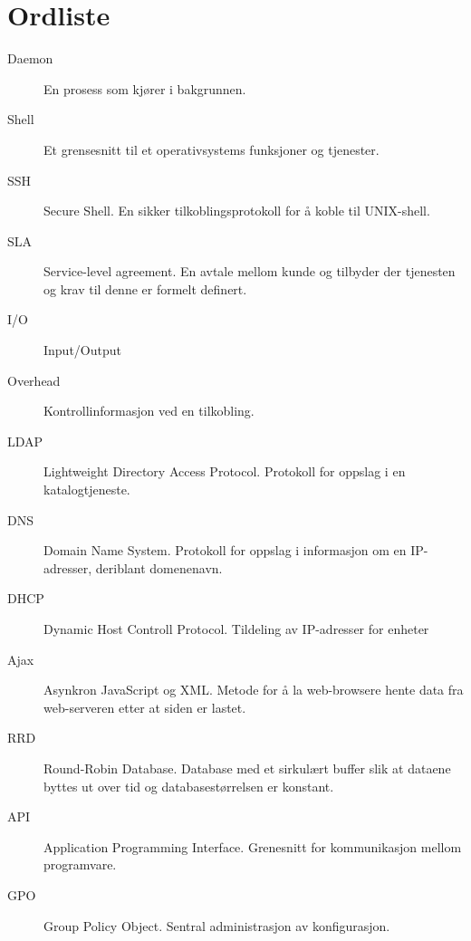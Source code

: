 \chapter*{Ordliste}
\begin{description}
	\item[Daemon] En prosess som kjører i bakgrunnen.
	\item[Shell] Et grensesnitt til et operativsystems funksjoner og tjenester.
	\item[SSH] Secure Shell. En sikker tilkoblingsprotokoll for å koble til UNIX-shell.
	\item[SLA] Service-level agreement. En avtale mellom kunde og tilbyder der tjenesten og krav til denne er formelt definert.
	\item[I/O] Input/Output
	\item[Overhead] Kontrollinformasjon ved en tilkobling.
	\item[LDAP] Lightweight Directory Access Protocol. Protokoll for oppslag i en katalogtjeneste.
	\item[DNS] Domain Name System. Protokoll for oppslag i informasjon om en IP-adresser, deriblant domenenavn.
	\item[DHCP] Dynamic Host Controll Protocol. Tildeling av IP-adresser for enheter
	\item[Ajax] Asynkron JavaScript og XML. Metode for å la web-browsere hente data fra web-serveren etter at siden er lastet.
	\item[RRD] Round-Robin Database. Database med et sirkulært buffer slik at dataene byttes ut over tid og databasestørrelsen er konstant.
	\item[API] Application Programming Interface. Grenesnitt for kommunikasjon mellom programvare.
	\item[GPO] Group Policy Object. Sentral administrasjon av konfigurasjon.
\end{description}

